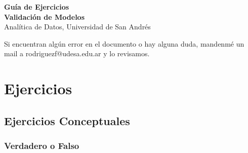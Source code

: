\documentclass[12pt]{article}
\begin{document}
\begin{center}
  {\LARGE \textbf{Guía de Ejercicios\\Validación de Modelos}}\\[0.5em]
  {Analítica de Datos, Universidad de San Andrés}
\end{center}

Si encuentran algún error en el documento o hay alguna duda, mandenmé un mail a rodriguezf@udesa.edu.ar y lo revisamos.

\section{Ejercicios}

\subsection{Ejercicios Conceptuales}

\subsubsection{Verdadero o Falso}
\end{document}
